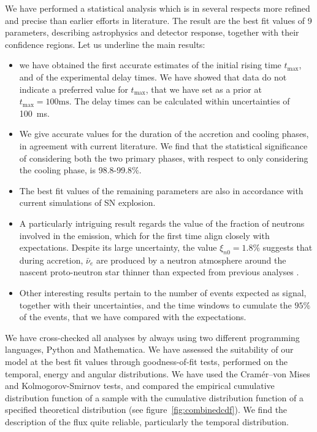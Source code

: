 \documentclass[a4paper,11pt]{article}
\begin{document}
We have performed a  statistical analysis which is in several respects  more refined and precise than earlier efforts in literature.
The result  are the best fit values of 9 parameters, describing astrophysics and detector response, 
together with their confidence regions. Let us underline the main results:
\begin{itemize}[label=--]
 \item we have obtained the first accurate estimates  of the initial rising time $t_{\text{max}}$, and of the experimental delay times. We have showed that data do not indicate a preferred value for $t_{\text{max}}$, that we have set as a prior at 
$t_{\text{max}}=100\mbox{ms}$.
The delay times can be calculated within uncertainties of 100~ms.
\item We   give accurate values for the duration of the accretion and cooling phases, in agreement with current literature.  We find that the statistical significance of considering both the two primary phases, with respect to only considering the cooling phase, is 98.8-99.8$\%$.
\item The best fit values of the remaining parameters are also in accordance with current simulations of SN explosion. 
\item A particularly intriguing result regards the value of 
the fraction of neutrons involved in the emission, which for the first time align closely with expectations. Despite its large uncertainty, the value $\xi_{n0}=1.8\%$ suggests that during accretion,  $\bar\nu_e$ are produced by a  neutron atmosphere around the nascent proto-neutron star thinner than expected from previous analyses \cite{Loredo:2001rx, Pagliaroli:2008ur}.
\item Other interesting results pertain to 
the number of events expected as  signal,
 together with their uncertainties, and 
the  time windows to cumulate the $95\%$  of the events, that we have compared with the expectations. 
\end{itemize}

  We have cross-checked  all analyses by always using two different programming languages, Python and Mathematica. 
We have assessed the suitability 
of our model at the best fit values  through goodness-of-fit tests,   performed on the temporal,
energy and angular distributions.
We have used the Cramér–von Mises and Kolmogorov-Smirnov tests, and compared 
 the empirical cumulative distribution function  of a sample with the cumulative distribution function  of a specified theoretical distribution (see figure~\ref{fig:combinedcdf}). We find the   description of the flux quite reliable,   particularly the temporal distribution.
\end{document}
